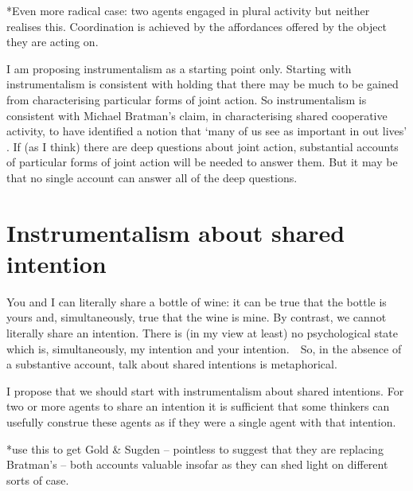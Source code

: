 \documentclass[12pt]{amsart}
\begin{document}
*Even more radical case: two agents engaged in plural activity but neither realises this.  Coordination is achieved by the affordances offered by the object they are acting on.
 
I am proposing instrumentalism as a starting point only.  Starting with instrumentalism is consistent with holding that there may be much to be gained from characterising particular forms of joint action.  So instrumentalism is consistent with Michael Bratman's claim, in characterising shared cooperative activity, to have identified a notion that `many of us see as important in out lives' \citep[327]{Bratman:1992mi}.  If (as I think) there are deep questions about joint action, substantial accounts of particular forms of joint action will be needed to answer them.  But it may be that no single account can answer all of the deep questions.



\section{Instrumentalism about shared intention}
You and I can literally share a bottle of wine: it can be true that the bottle is yours and, simultaneously, true that the wine is mine.   By contrast, we cannot literally share an intention.  There is (in my view at least) no psychological state which is, simultaneously, my intention and your intention.\footnotemark  \ \ So, in the absence of a substantive account, talk about shared intentions is metaphorical.

I propose that we should start with instrumentalism about shared intentions.  For two or more agents to share an intention it is sufficient that some thinkers can usefully construe these agents as if they were a single agent with that intention.

 *use this to get Gold \& Sugden -- pointless to suggest that they are replacing Bratman's -- both accounts valuable insofar as they can shed light on different sorts of case.




\end{document}
